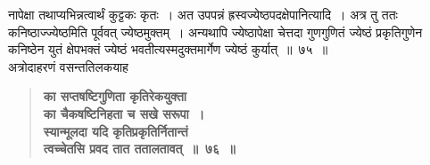 \documentclass[11pt, openany]{book}
\begin{document}
\begin{sloppypar}
\noindent नापेक्षा तथाप्यभिन्नत्वार्थं कुट्टकः कृतः~। अत उपपन्नं ह्रस्वज्येष्ठपदक्षेपानित्यादि~। अत्र तु ततः कनिष्ठाज्ज्येष्ठमिति पूर्ववत् ज्येष्ठमुक्तम्~। अन्यथापि ज्येष्ठापेक्षा चेत्तदा गुणगुणितं ज्येष्ठं प्रकृतिगुणेन कनिष्ठेन युतं क्षेपभक्तं ज्येष्ठं भवतीत्यस्मदुक्तमार्गेण ज्येष्ठं कुर्यात्~॥~७५~॥\\

{\small अत्रोदाहरणं वसन्ततिलकयाह\textendash }

 \label{6.76}
\begin{quote}
{\large \textbf{{\color{purple}का सप्तषष्टिगुणिता कृतिरेकयुक्ता \\
का चैकषष्टिनिहता च सखे सरूपा~।\\
स्यान्मूलदा यदि कृतिप्रकृतिर्नितान्तं \\
त्वच्चेतसि प्रवद तात ततालतावत्~॥~७६~॥}}}
\end{quote}


\end{sloppypar}
\end{document}
